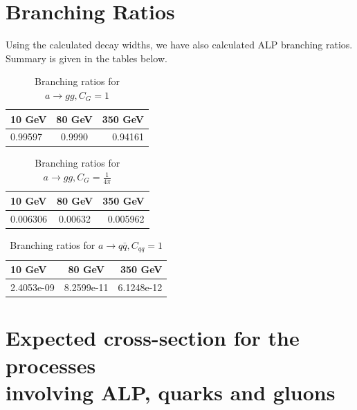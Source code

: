\documentclass[12pt,a4paper]{article}
\begin{document}
\section{Branching Ratios}
Using the calculated decay widths, we have also calculated ALP branching ratios. Summary is given in the tables below.

\begin{table}[h!]
\begin{center}
\label{tab : table8}
\begin{tabular}{l|c|r}
\hline
\textbf{10 GeV} & \textbf{80 GeV} & \textbf{350 GeV}\\
\hline
0.99597 & 0.9990 & 0.94161 \\
\hline
\end{tabular}
\caption{Branching ratios for $a \rightarrow g g, C_G = 1$ }
\end{center}
\end{table}

\begin{table}[h!]
\begin{center}
\label{tab : table9}
\begin{tabular}{l|c|r}
\hline
\textbf{10 GeV} & \textbf{80 GeV} & \textbf{350 GeV}\\
\hline
0.006306 & 0.00632 & 0.005962 \\
\hline
\end{tabular}
\caption{Branching ratios for $a \rightarrow g g, C_G = \frac{1}{4\pi}$ }
\end{center}
\end{table}

\begin{table}[h!]
\begin{center}
\label{tab : table10}
\begin{tabular}{l|c|r}
\hline
\textbf{10 GeV} & \textbf{80 GeV} & \textbf{350 GeV}\\
\hline
2.4053e-09 & 8.2599e-11 & 6.1248e-12 \\
\hline
\end{tabular}
\caption{Branching ratios for $a \rightarrow q \bar{q}, C_{qq} = 1$ }
\end{center}
\end{table}

\section{Expected cross-section for the processes\\ involving ALP, quarks and gluons}
\end{document}
